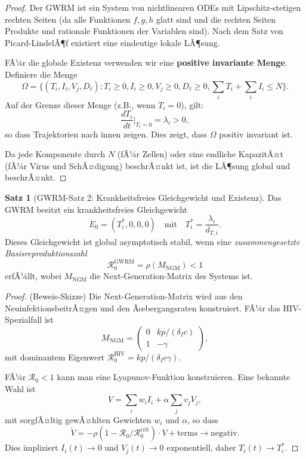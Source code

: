 ﻿\documentclass[a4paper,12pt]{article}
\theoremstyle{definition}
\newtheorem{satz}{Satz}
\begin{document}
\begin{proof}
Der GWRM ist ein System von nichtlinearen ODEs mit Lipschitz-stetigen rechten Seiten (da alle Funktionen $f, g, h$ glatt sind und die rechten Seiten Produkte und rationale Funktionen der Variablen sind). Nach dem Satz von Picard-LindelÃ¶f existiert eine eindeutige lokale LÃ¶sung.

FÃ¼r die globale Existenz verwenden wir eine \textbf{positive invariante Menge}. Definiere die Menge
\[
\Omega = \{(T_i, I_i, V_j, D_\ell) : T_i \geq 0, I_i \geq 0, V_j \geq 0, D_\ell \geq 0, \sum_i T_i + \sum_i I_i \leq N\}.
\]
Auf der Grenze dieser Menge (z.B., wenn $T_i = 0$), gilt:
\[
\frac{dT_i}{dt}\bigg|_{T_i=0} = \lambda_i > 0,
\]
so dass Trajektorien nach innen zeigen. Dies zeigt, dass $\Omega$ positiv invariant ist.

Da jede Komponente durch $N$ (fÃ¼r Zellen) oder eine endliche KapazitÃ¤t (fÃ¼r Virus und SchÃ¤digung) beschrÃ¤nkt ist, ist die LÃ¶sung global und beschrÃ¤nkt.
\end{proof}

\begin{satz}[GWRM-Satz 2: Krankheitsfreies Gleichgewicht und Existenz]
Das GWRM besitzt ein krankheitsfreies Gleichgewicht
\[
E_0 = (T_i^*, 0, 0, 0) \quad \text{mit} \quad T_i^* = \frac{\lambda_i}{d_{T,i}}.
\]
Dieses Gleichgewicht ist global asymptotisch stabil, wenn eine \emph{zusammengesetzte Basisreproduktionszahl}
\[
\mathcal{R}_0^{\text{GWRM}} = \rho(M_{\text{NGM}}) < 1
\]
erfÃ¼llt, wobei $M_{\text{NGM}}$ die Next-Generation-Matrix des Systems ist.
\end{satz}

\begin{proof}
(Beweis-Skizze) Die Next-Generation-Matrix wird aus den NeuinfektionsbeitrÃ¤gen und den Ãœbergangsraten konstruiert. FÃ¼r das HIV-Spezialfall ist
\[
M_{\text{NGM}} = \begin{pmatrix} 0 & k p / (\delta_I c) \\ 1 & - \gamma \end{pmatrix},
\]
mit dominantem Eigenwert $\mathcal{R}_0^{\text{HIV}} = kp/(\delta_I c \gamma)$.

FÃ¼r $\mathcal{R}_0 < 1$ kann man eine Lyapunov-Funktion konstruieren. Eine bekannte Wahl ist
\[
V = \sum_{i} w_i I_i + \alpha \sum_j v_j V_j,
\]
mit sorgfÃ¤ltig gewÃ¤hlten Gewichten $w_i$ und $\alpha$, so dass
\[
\dot{V} = - \rho (1 - \mathcal{R}_0/\mathcal{R}_0^{\text{crit}}) \cdot V + \text{terms} \rightarrow \text{negativ}.
\]
Dies impliziert $I_i(t) \to 0$ und $V_j(t) \to 0$ exponentiell, daher $T_i(t) \to T_i^*$.
\end{proof}
\end{document}
